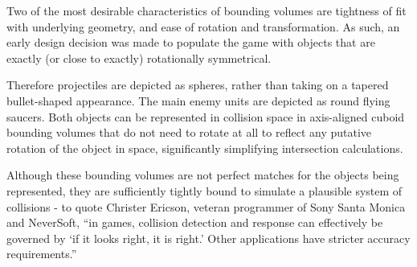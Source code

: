\documentclass[11pt]{article}
\begin{document}
Two of the most desirable characteristics of bounding volumes are tightness of fit with underlying geometry,
and ease of rotation and transformation\cite[p. 76]{ericson}. As such, an early design decision was made to
populate the game with objects that are exactly (or close to exactly) rotationally symmetrical.

Therefore projectiles are depicted as spheres, rather than taking on a tapered bullet-shaped appearance. The main
enemy units are depicted as round flying saucers. Both objects can be represented in collision space in
axis-aligned cuboid bounding volumes that do not need to rotate at all to reflect any putative rotation of
the object in space, significantly simplifying intersection calculations.

Although these bounding volumes are not perfect matches for the objects being represented, they are sufficiently
tightly bound to simulate a plausible system of collisions - to quote Christer Ericson, veteran programmer of Sony
Santa Monica and NeverSoft, ``in games, collision detection and response can effectively be governed by `if it looks
right, it is right.' Other applications have stricter accuracy requirements\cite[p. 12]{ericson}.''
\end{document}

